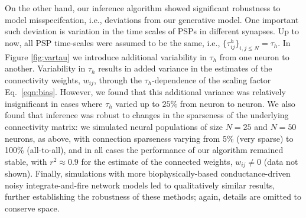 \documentclass[aoas,preprint]{imsart}
\begin{document}
On the other hand, our inference algorithm showed significant
robustness to model misspecifcation, i.e., deviations from our
generative model. One important such deviation is variation in the
time scales of PSPs in different synapses. Up to now, all PSP
time-scales were assumed to be the same, i.e.,
$\{\tau^h_{ij}\}_{i,j\leq N}=\tau_h$. In Figure \ref{fig:vartau} we
introduce additional variability in $\tau_h$ from one neuron to
another. Variability in $\tau_h$ results in added variance in the
estimates of the connectivity weights, $w_{ij}$, through the
$\tau_h$-dependence of the scaling factor Eq.~\eqref{eqn:bias}.
However, we found that this additional variance was relatively
insignificant in cases where $\tau_h$ varied up to $25\%$ from neuron
to neuron.  We also found that inference was robust to changes in the
sparseness of the underlying connectivity matrix: we simulated neural
populations of size $N=25$ and $N=50$ neurons, as above, with
connection sparseness varying from 5\% (very sparse) to 100\%
(all-to-all), and in all cases the performance of our algorithm
remained stable, with $r^2\approx 0.9$ for the estimate of the
connected weights, $w_{ij}\neq 0$ (data not shown).  Finally,
simulations with more biophysically-based conductance-driven noisy
integrate-and-fire network models \cite{Vogels05} led to qualitatively
similar results, further establishing the robustness of these methods;
again, details are omitted to conserve space.

\end{document}
